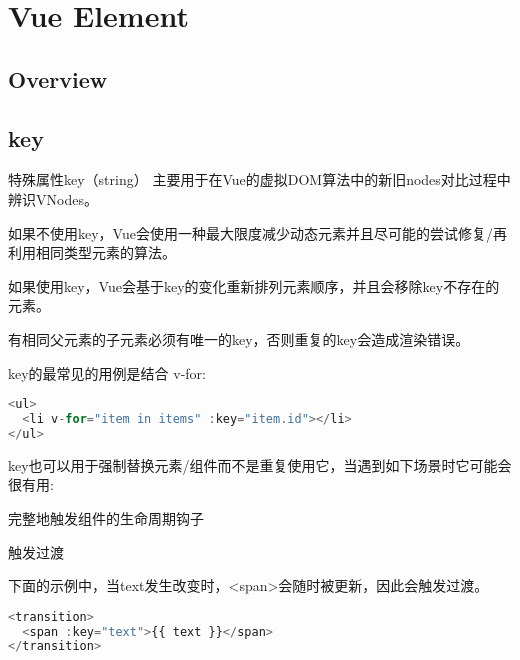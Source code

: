 \part{Vue Element}


\chapter{Overview}


\chapter{key}

特殊属性key（string） 主要用于在Vue的虚拟DOM算法中的新旧nodes对比过程中辨识VNodes。

\begin{compactitem}
\item 如果不使用key，Vue会使用一种最大限度减少动态元素并且尽可能的尝试修复/再利用相同类型元素的算法。
\item 如果使用key，Vue会基于key的变化重新排列元素顺序，并且会移除key不存在的元素。
\end{compactitem}



有相同父元素的子元素必须有唯一的key，否则重复的key会造成渲染错误。

key的最常见的用例是结合 v-for:



\begin{lstlisting}[language=JavaScript]
<ul>
  <li v-for="item in items" :key="item.id"></li>
</ul>
\end{lstlisting}

key也可以用于强制替换元素/组件而不是重复使用它，当遇到如下场景时它可能会很有用:

\begin{compactitem}
\item 完整地触发组件的生命周期钩子
\item 触发过渡
\end{compactitem}

下面的示例中，当text发生改变时，<span>会随时被更新，因此会触发过渡。

\begin{lstlisting}[language=JavaScript]
<transition>
  <span :key="text">{{ text }}</span>
</transition>
\end{lstlisting}




\begin{lstlisting}[language=JavaScript]

\end{lstlisting}





